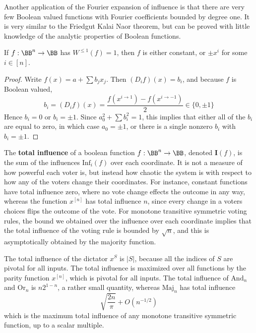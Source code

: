 Another application of the Fourier expansion of influence is that there are very few Boolean valued functions with Fourier coefficients bounded by degree one. It is very similar to the Friedgut Kalai Naor theorem, but can be proved with little knowledge of the analytic properties of Boolean functions.

\begin{lemma}
    If $f: \BB^n \to \BB$ has $W^{\leq 1}(f) = 1$, then $f$ is either constant, or $\pm x^i$ for some $i \in [n]$.
\end{lemma}
\begin{proof}
    Write $f(x) = a + \sum b_j x_j$. Then $(D_i f)(x) = b_i$, and because $f$ is Boolean valued,
    \[ b_i = (D_i f)(x) = \frac{f(x^{i \to 1}) - f(x^{i \to -1})}{2} \in \{ 0, \pm 1 \} \]
    Hence $b_i = 0$ or $b_i = \pm 1$. Since $a_0^2 + \sum b_i^2 = 1$, this implies that either all of the $b_i$ are equal to zero, in which case $a_0 = \pm 1$, or there is a single nonzero $b_i$ with $b_i = \pm 1$.
\end{proof}

The {\bf total influence} of a boolean function $f: \BB^n \to \BB$, denoted $\mathbf{I}(f)$, is the sum of the influences $\text{Inf}_i(f)$ over each coordinate. It is not a measure of how powerful each voter is, but instead how chaotic the system is with respect to how any of the voters change their coordinates. For instance, constant functions have total influence zero, where no vote change effects the outcome in any way, whereas the function $x^{[n]}$ has total influence $n$, since every change in a voters choices flips the outcome of the vote. For monotone transitive symmetric voting rules, the bound we obtained over the influence over each coordinate implies that the total influence of the voting rule is bounded by $\sqrt{n}$, and this is asymptotically obtained by the majority function.

\begin{example}
    The total influence of the dictator $x^S$ is $|S|$, because all the indices of $S$ are pivotal for all inputs. The total influence is maximized over all functions by the parity function $x^{[n]}$, which is pivotal for all inputs. The total influence of $\text{And}_n$ and $\text{Or}_n$ is $n2^{1-n}$, a rather small quantity, whereas $\text{Maj}_n$ has total influence
    \[ \sqrt{\frac{2n}{\pi}} + O \left( n^{-1/2} \right) \]
    which is the maximum total influence of any monotone transitive symmetric function, up to a scalar multiple.
\end{example}

